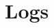 \documentclass[12pt,a4paper]{article}
\begin{document}











\newpage
\section{Logs}
\end{document}
